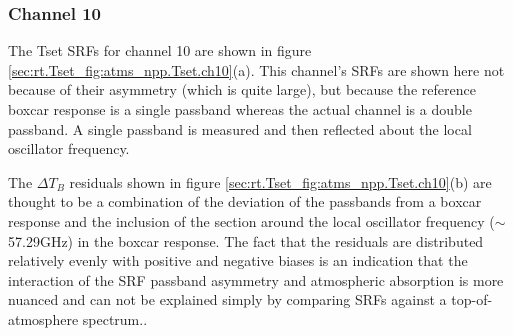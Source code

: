\subsubsection{Channel 10}
The Tset SRFs for channel 10 are shown in figure \ref{sec:rt.Tset_fig:atms_npp.Tset.ch10}(a). This channel's SRFs are shown here not because of their asymmetry (which is quite large), but because the reference boxcar response is a single passband whereas the actual channel is a double passband. A single passband is measured and then reflected about the local oscillator frequency.

The $\Delta T_B$ residuals shown in figure \ref{sec:rt.Tset_fig:atms_npp.Tset.ch10}(b) are thought to be a combination of the deviation of the passbands from a boxcar response and the inclusion of the section around the local oscillator frequency ($\sim$57.29GHz) in the boxcar response. The fact that the residuals are distributed relatively evenly with positive and negative biases is an indication that the interaction of the SRF passband asymmetry and atmospheric absorption is more nuanced and can not be explained simply by comparing SRFs against a top-of-atmosphere spectrum..
